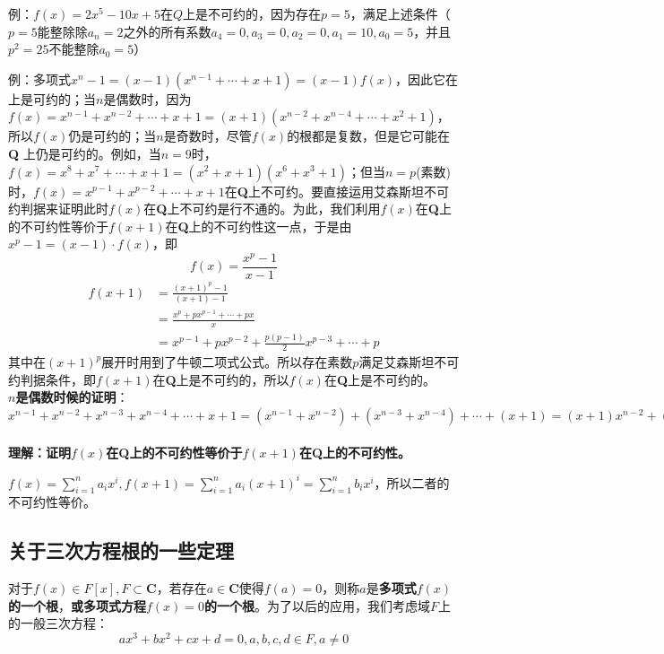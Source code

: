\documentclass[12pt]{article}
\begin{document}
\begin{framed}
\small{
例：$f(x) = 2x^5 - 10x + 5$在$Q$上是不可约的，因为存在$p = 5$，满足上述条件（$p=5$能整除除$a_n=2$之外的所有系数$a_4 = 0, a_3 = 0, a_2 = 0, a_1 = 10, a_0 = 5$，并且$p^2 = 25$不能整除$a_0 = 5$）

例：多项式$x^n - 1 = (x-1)(x^{n-1} + \cdots + x + 1) = (x-1)f(x)$，因此它在上是可约的；当$n$是偶数时，因为$f(x) = x^{n-1} + x^{n-2} + \cdots + x + 1 = (x+1)(x^{n-2} + x^{n-4} + \cdots + x^2 + 1)$，所以$f(x)$仍是可约的；当$n$是奇数时，尽管$f(x)$的根都是复数，但是它可能在\textbf{Q} 上仍是可约的。例如，当$n=9$时，$f(x) = x^8 + x^7 + \cdots + x + 1 = (x^2 + x + 1)(x^6 + x^3 + 1)$；但当$n=p$(素数)时，$f(x) = x^{p-1} + x^{p-2} + \cdots + x + 1$在\textbf{Q}上不可约。要直接运用艾森斯坦不可约判据来证明此时$f(x)$在\textbf{Q}上不可约是行不通的。为此，我们利用$f(x)$在\textbf{Q}上的不可约性等价于$f(x+1)$在\textbf{Q}上的不可约性这一点，于是由$x^p - 1 = (x-1) \cdot f(x)$，即
$$
f(x) = \frac{x^p - 1}{x - 1}
$$
\begin{align*}
f(x+1) &= \frac{(x+1)^p - 1}{(x+1) - 1} \\
	&= \frac{x^p + px^{p-1} + \cdots + px}{x} \\
	&= x^{p-1} + px^{p-2} + \frac{p(p-1)}{2}x^{p-3} + \cdots + p
\end{align*}
其中在$(x+1)^p$展开时用到了牛顿二项式公式。所以存在素数$p$满足艾森斯坦不可约判据条件，即$f(x+1)$在\textbf{Q}上是不可约的，所以$f(x)$在\textbf{Q}上是不可约的。
~\\

\textbf{$n$是偶数时候的证明}：$x^{n-1} + x^{n-2} + x^{n-3} + x^{n-4} + \cdots + x + 1 = (x^{n-1} + x^{n-2} )+ (x^{n-3} + x^{n-4}) + \cdots + (x + 1) = (x+1)x^{n-2} + (x+1)x^{n-4} + \cdots + (x+1) = (x+1)(x^{n-2} + x^{n-4} + \cdots + x^2 + 1)$
~\\

\textbf{理解：证明$f(x)$在\textbf{Q}上的不可约性等价于$f(x+1)$在\textbf{Q}上的不可约性。}

$f(x) = \sum_{i=1}^na_ix^i, f(x+1) = \sum_{i=1}^na_i(x+1)^i = \sum_{i=1}^nb_ix^i$，所以二者的不可约性等价。
}
\end{framed}

\subsection{关于三次方程根的一些定理}
对于$f(x) \in F[x], F \subset \mathbf{C}$，若存在$a \in \mathbf{C}$使得$f(a) = 0$，则称$a$是\textbf{多项式$f(x)$的一个根}，\textbf{或多项式方程$f(x) = 0$的一个根}。为了以后的应用，我们考虑域$F$上的一般三次方程：
$$
ax^3 + bx^2 + cx + d = 0, a, b, c, d \in F, a \neq 0
$$
\end{document}
